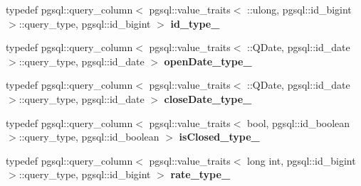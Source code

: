 \begin{DoxyCompactItemize}
\item 
typedef pgsql\+::query\+\_\+column$<$ pgsql\+::value\+\_\+traits$<$ \+::ulong, pgsql\+::id\+\_\+bigint $>$\+::query\+\_\+type, pgsql\+::id\+\_\+bigint $>$ {\bfseries id\+\_\+type\+\_\+}\hypertarget{structodb_1_1pointer__query__columns_3_01_1_1kpk_1_1data_1_1_loan_00_01id__pgsql_00_01_a_01_4_a3fc45f3e70395af10fa6cbd9484d9ee3}{}\label{structodb_1_1pointer__query__columns_3_01_1_1kpk_1_1data_1_1_loan_00_01id__pgsql_00_01_a_01_4_a3fc45f3e70395af10fa6cbd9484d9ee3}

\item 
typedef pgsql\+::query\+\_\+column$<$ pgsql\+::value\+\_\+traits$<$ \+::Q\+Date, pgsql\+::id\+\_\+date $>$\+::query\+\_\+type, pgsql\+::id\+\_\+date $>$ {\bfseries open\+Date\+\_\+type\+\_\+}\hypertarget{structodb_1_1pointer__query__columns_3_01_1_1kpk_1_1data_1_1_loan_00_01id__pgsql_00_01_a_01_4_a9ee400515a851daedba426f654c2159c}{}\label{structodb_1_1pointer__query__columns_3_01_1_1kpk_1_1data_1_1_loan_00_01id__pgsql_00_01_a_01_4_a9ee400515a851daedba426f654c2159c}

\item 
typedef pgsql\+::query\+\_\+column$<$ pgsql\+::value\+\_\+traits$<$ \+::Q\+Date, pgsql\+::id\+\_\+date $>$\+::query\+\_\+type, pgsql\+::id\+\_\+date $>$ {\bfseries close\+Date\+\_\+type\+\_\+}\hypertarget{structodb_1_1pointer__query__columns_3_01_1_1kpk_1_1data_1_1_loan_00_01id__pgsql_00_01_a_01_4_a9c81fdbf12fb03fc2447f2f947773cc2}{}\label{structodb_1_1pointer__query__columns_3_01_1_1kpk_1_1data_1_1_loan_00_01id__pgsql_00_01_a_01_4_a9c81fdbf12fb03fc2447f2f947773cc2}

\item 
typedef pgsql\+::query\+\_\+column$<$ pgsql\+::value\+\_\+traits$<$ bool, pgsql\+::id\+\_\+boolean $>$\+::query\+\_\+type, pgsql\+::id\+\_\+boolean $>$ {\bfseries is\+Closed\+\_\+type\+\_\+}\hypertarget{structodb_1_1pointer__query__columns_3_01_1_1kpk_1_1data_1_1_loan_00_01id__pgsql_00_01_a_01_4_aeb9858ac3f30b504622bda98e53012ea}{}\label{structodb_1_1pointer__query__columns_3_01_1_1kpk_1_1data_1_1_loan_00_01id__pgsql_00_01_a_01_4_aeb9858ac3f30b504622bda98e53012ea}

\item 
typedef pgsql\+::query\+\_\+column$<$ pgsql\+::value\+\_\+traits$<$ long int, pgsql\+::id\+\_\+bigint $>$\+::query\+\_\+type, pgsql\+::id\+\_\+bigint $>$ {\bfseries rate\+\_\+type\+\_\+}\hypertarget{structodb_1_1pointer__query__columns_3_01_1_1kpk_1_1data_1_1_loan_00_01id__pgsql_00_01_a_01_4_a10e3f55505b13ecc5d080daf53aafb34}{}\label{structodb_1_1pointer__query__columns_3_01_1_1kpk_1_1data_1_1_loan_00_01id__pgsql_00_01_a_01_4_a10e3f55505b13ecc5d080daf53aafb34}


\end{DoxyCompactItemize}
